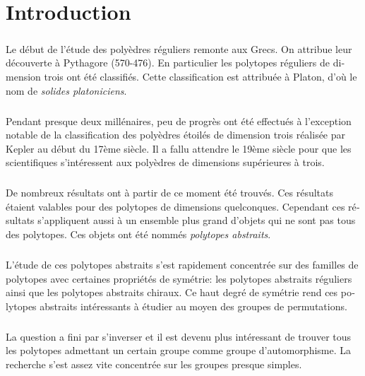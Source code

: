 \chapter*{Introduction}

\begin{otherlanguage}{french}

\paragraph{}
Le début de l'étude des polyèdres réguliers remonte aux Grecs. On attribue leur découverte à Pythagore (570-476). En particulier les  polytopes réguliers de dimension trois ont été classifiés. Cette classification est attribuée à Platon, d'où le nom de \textit{solides platoniciens}.

\paragraph{}
Pendant presque deux millénaires, peu de progrès ont été effectués à l'exception notable de la classification des polyèdres étoilés de dimension trois réalisée par Kepler au début du 17ème siècle. Il a fallu attendre le 19ème siècle pour que les scientifiques s'intéressent aux polyèdres de dimensions supérieures à trois.

\paragraph{}
De nombreux résultats ont à partir de ce moment été trouvés. Ces résultats étaient valables pour des polytopes de dimensions quelconques. Cependant ces résultats s'appliquent aussi à un ensemble plus grand d'objets qui ne sont pas tous des polytopes. Ces objets ont été nommés \textit{polytopes abstraits}.

\paragraph{}
L'étude de ces polytopes abstraits s'est rapidement concentrée sur des familles de polytopes avec certaines propriétés de symétrie: les polytopes abstraits réguliers ainsi que les polytopes abstraits chiraux. Ce haut degré de symétrie rend ces polytopes abstraits intéressants à étudier au moyen des groupes de permutations.

\paragraph{}
La question a fini par s'inverser et il est devenu plus intéressant de trouver tous les polytopes admettant un certain groupe comme groupe d'automorphisme. La recherche s'est assez vite concentrée sur les groupes presque simples.


\end{otherlanguage}
